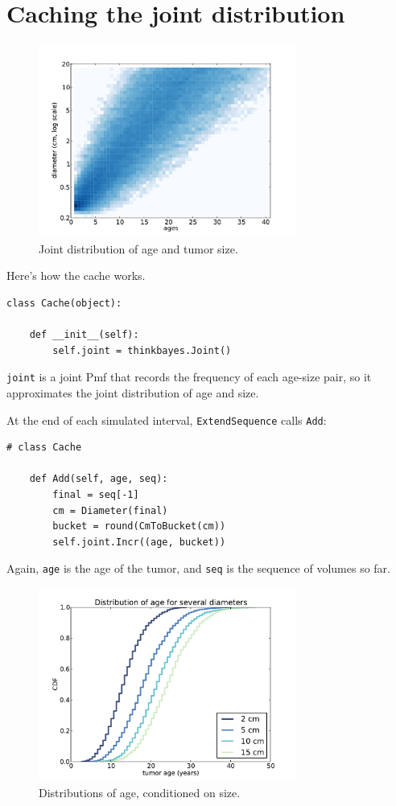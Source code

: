 \documentclass[12pt]{book}
\begin{document}
\section{Caching the joint distribution}

\begin{figure}
\centerline{\includegraphics[height=2.5in]{figs/kidney8.pdf}}
\caption{Joint distribution of age and tumor size.}
\label{fig.kidney8}
\end{figure}

Here's how the cache works.  

\begin{verbatim}
class Cache(object):

    def __init__(self):
        self.joint = thinkbayes.Joint()
\end{verbatim}

{\tt joint} is a joint Pmf that records the
frequency of each age-size pair, so it approximates the
joint distribution of age and size.

At the end of each simulated interval, {\tt ExtendSequence} calls
{\tt Add}:

\begin{verbatim}
# class Cache

    def Add(self, age, seq):
        final = seq[-1]
        cm = Diameter(final)
        bucket = round(CmToBucket(cm))
        self.joint.Incr((age, bucket))
\end{verbatim}

Again, {\tt age} is the age of the tumor, and {\tt seq} is the
sequence of volumes so far.

\begin{figure}
\centerline{\includegraphics[height=2.5in]{figs/kidney6.pdf}}
\caption{Distributions of age, conditioned on size.}
\label{fig.kidney6}
\end{figure}
\end{document}
